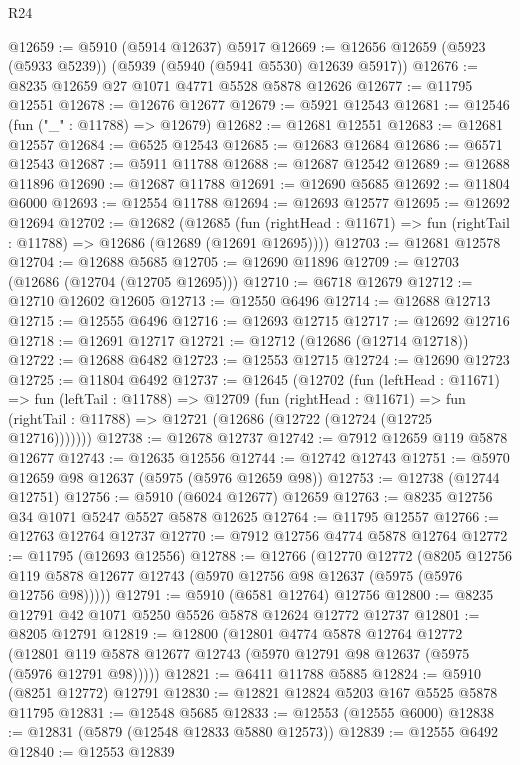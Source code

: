 \begin{lexlean}{R24}
\begin{coremodule}
@12659 := @5910 (@5914 @12637) @5917
@12669 := @12656 @12659 (@5923 (@5933 @5239)) (@5939 (@5940 (@5941 @5530) @12639 @5917))
@12676 := @8235 @12659 @27 @1071 @4771 @5528 @5878 @12626
@12677 := @11795 @12551
@12678 := @12676 @12677
@12679 := @5921 @12543
@12681 := @12546 (fun ("_" : @11788) => @12679)
@12682 := @12681 @12551
@12683 := @12681 @12557
@12684 := @6525 @12543
@12685 := @12683 @12684
@12686 := @6571 @12543
@12687 := @5911 @11788
@12688 := @12687 @12542
@12689 := @12688 @11896
@12690 := @12687 @11788
@12691 := @12690 @5685
@12692 := @11804 @6000
@12693 := @12554 @11788
@12694 := @12693 @12577
@12695 := @12692 @12694
@12702 := @12682
    (@12685
      (fun (rightHead : @11671) => fun (rightTail : @11788) => @12686 (@12689 (@12691 @12695))))
@12703 := @12681 @12578
@12704 := @12688 @5685
@12705 := @12690 @11896
@12709 := @12703 (@12686 (@12704 (@12705 @12695)))
@12710 := @6718 @12679
@12712 := @12710 @12602 @12605
@12713 := @12550 @6496
@12714 := @12688 @12713
@12715 := @12555 @6496
@12716 := @12693 @12715
@12717 := @12692 @12716
@12718 := @12691 @12717
@12721 := @12712 (@12686 (@12714 @12718))
@12722 := @12688 @6482
@12723 := @12553 @12715
@12724 := @12690 @12723
@12725 := @11804 @6492
@12737 := @12645
    (@12702
      (fun (leftHead : @11671) =>
      fun (leftTail : @11788) =>
      @12709
        (fun (rightHead : @11671) =>
        fun (rightTail : @11788) => @12721 (@12686 (@12722 (@12724 (@12725 @12716)))))))
@12738 := @12678 @12737
@12742 := @7912 @12659 @119 @5878 @12677
@12743 := @12635 @12556
@12744 := @12742 @12743
@12751 := @5970 @12659 @98 @12637 (@5975 (@5976 @12659 @98))
@12753 := @12738 (@12744 @12751)
@12756 := @5910 (@6024 @12677) @12659
@12763 := @8235 @12756 @34 @1071 @5247 @5527 @5878 @12625
@12764 := @11795 @12557
@12766 := @12763 @12764 @12737
@12770 := @7912 @12756 @4774 @5878 @12764
@12772 := @11795 (@12693 @12556)
@12788 := @12766
    (@12770
      @12772
      (@8205 @12756 @119 @5878 @12677 @12743 (@5970 @12756 @98 @12637 (@5975 (@5976 @12756 @98)))))
@12791 := @5910 (@6581 @12764) @12756
@12800 := @8235 @12791 @42 @1071 @5250 @5526 @5878 @12624 @12772 @12737
@12801 := @8205 @12791
@12819 := @12800
    (@12801
      @4774
      @5878
      @12764
      @12772
      (@12801 @119 @5878 @12677 @12743 (@5970 @12791 @98 @12637 (@5975 (@5976 @12791 @98)))))
@12821 := @6411 @11788 @5885
@12824 := @5910 (@8251 @12772) @12791
@12830 := @12821 @12824 @5203 @167 @5525 @5878 @11795
@12831 := @12548 @5685
@12833 := @12553 (@12555 @6000)
@12838 := @12831 (@5879 (@12548 @12833 @5880 @12573))
@12839 := @12555 @6492
@12840 := @12553 @12839

\end{coremodule}
\end{lexlean}
